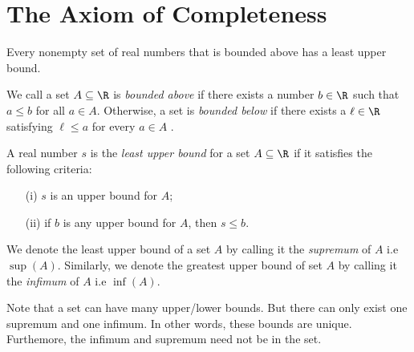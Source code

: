 
\section{The Axiom of Completeness}

\begin{tcolorbox}
    \begin{thm}
        Every nonempty set of real numbers that is bounded above has a least upper bound.
    \end{thm}
\end{tcolorbox}

\begin{tcolorbox}
    \begin{defn}
        We call a set \( A \subseteq \R \) is \textit{bounded above} if there exists a number \( b \in \R \) such that \( a \leq b \) for all \( a \in A \).
        Otherwise, a set is \textit{bounded below} if there exists a \( \ell \in \R \) satisfying \( \ell \leq a \) for every \( a \in A \) .
    \end{defn}

\end{tcolorbox}

\begin{tcolorbox}

    \begin{defn}
        A real number \( s \) is the \textit{least upper bound} for a set \( A \subseteq \R \) if it satisfies the following criteria:

        \begin{enumerate}
            \item[(i)] \( s \) is an upper bound for \( A \);
            \item[(ii)] if \( b \) is any upper bound for \( A \), then \( s \leq b \). 
        \end{enumerate}


        
    \end{defn}


\end{tcolorbox}

We denote the least upper bound of a set \( A \) by calling it the \textit{supremum} of \( A \) i.e \( \sup(A) \). Similarly, we denote the greatest upper bound of set \( A \) by calling it the \textit{infimum} of \( A \) i.e \( \inf(A) \).

Note that a set can have many upper/lower bounds. But there can only exist one supremum and one infimum. In other words, these bounds are unique. Furthemore, the infimum and supremum need not be in the set.

